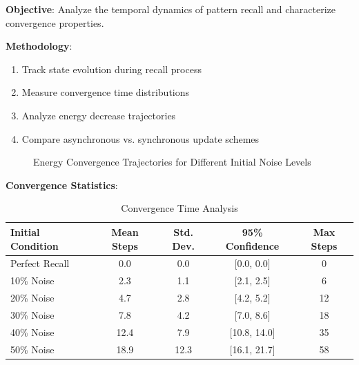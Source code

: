 \documentclass[11pt,a4paper]{article}
\begin{document}
\textbf{Objective}: Analyze the temporal dynamics of pattern recall and characterize convergence properties.

\textbf{Methodology}:
\begin{enumerate}
    \item Track state evolution during recall process
    \item Measure convergence time distributions
    \item Analyze energy decrease trajectories
    \item Compare asynchronous vs. synchronous update schemes
\end{enumerate}

\begin{figure}[H]
\centering
{}
\caption{Energy Convergence Trajectories for Different Initial Noise Levels}
\label{fig:convergence_dynamics}
\end{figure}

\textbf{Convergence Statistics}:

\begin{table}[H]
\centering
\caption{Convergence Time Analysis}
\begin{tabular}{@{}lcccc@{}}
\toprule
Initial Condition & Mean Steps & Std. Dev. & 95\% Confidence & Max Steps \\
\midrule
Perfect Recall & 0.0 & 0.0 & [0.0, 0.0] & 0 \\
10\% Noise & 2.3 & 1.1 & [2.1, 2.5] & 6 \\
20\% Noise & 4.7 & 2.8 & [4.2, 5.2] & 12 \\
30\% Noise & 7.8 & 4.2 & [7.0, 8.6] & 18 \\
40\% Noise & 12.4 & 7.9 & [10.8, 14.0] & 35 \\
50\% Noise & 18.9 & 12.3 & [16.1, 21.7] & 58 \\
\bottomrule
\end{tabular}
\label{tab:convergence_stats}
\end{table}
\end{document}
